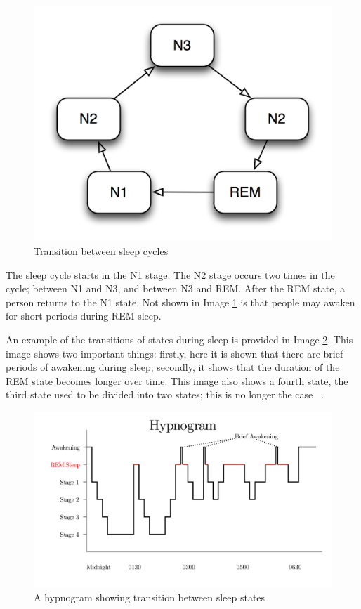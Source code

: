 \begin{figure}[htbp]
  \centering
    \includegraphics[scale=1]{images/sleep_cycle.png}
  \caption{Transition between sleep cycles}
  \label{fig:images_sleep_cycle}
\end{figure}

The sleep cycle starts in the N1 stage. The N2 stage occurs two times in the cycle; between N1 and N3, and between N3 and REM. After the REM state, a person returns to the N1 state. Not shown in Image \ref{fig:images_sleep_cycle} is that people may awaken for short periods during REM sleep.

An example of the transitions of states during sleep is provided in Image \ref{fig:hypnogram}. This image shows two important things: firstly, here it is shown that there are brief periods of awakening during sleep; secondly, it shows that the duration of the REM state becomes longer over time. This image also shows a fourth state, the third state used to be divided into two states; this is no longer the case ~\cite{Silber:2007fk}.

\begin{figure}[htbp]
  \centering
    \includegraphics[width=\textwidth]{images/hypnogram.png}
  \caption{A hypnogram showing transition between sleep states ~\cite{RazerM:2011uq}}
  \label{fig:hypnogram}
\end{figure}

